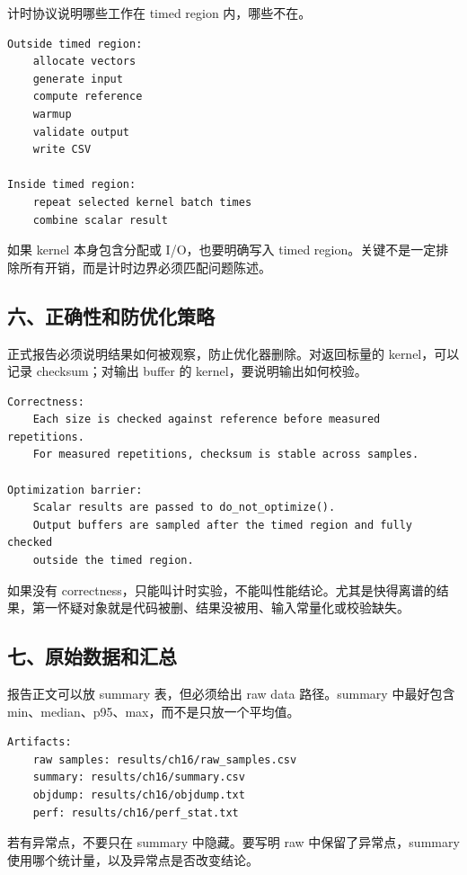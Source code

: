 计时协议说明哪些工作在 timed region 内，哪些不在。

\begin{lstlisting}
Outside timed region:
    allocate vectors
    generate input
    compute reference
    warmup
    validate output
    write CSV

Inside timed region:
    repeat selected kernel batch times
    combine scalar result
\end{lstlisting}

如果 kernel 本身包含分配或 I/O，也要明确写入 timed region。关键不是一定排除所有开销，而是计时边界必须匹配问题陈述。

\subsection{六、正确性和防优化策略}

正式报告必须说明结果如何被观察，防止优化器删除。对返回标量的 kernel，可以记录 checksum；对输出 buffer 的 kernel，要说明输出如何校验。

\begin{lstlisting}
Correctness:
    Each size is checked against reference before measured repetitions.
    For measured repetitions, checksum is stable across samples.

Optimization barrier:
    Scalar results are passed to do_not_optimize().
    Output buffers are sampled after the timed region and fully checked
    outside the timed region.
\end{lstlisting}

如果没有 correctness，只能叫计时实验，不能叫性能结论。尤其是快得离谱的结果，第一怀疑对象就是代码被删、结果没被用、输入常量化或校验缺失。

\subsection{七、原始数据和汇总}

报告正文可以放 summary 表，但必须给出 raw data 路径。summary 中最好包含 min、median、p95、max，而不是只放一个平均值。

\begin{lstlisting}
Artifacts:
    raw samples: results/ch16/raw_samples.csv
    summary: results/ch16/summary.csv
    objdump: results/ch16/objdump.txt
    perf: results/ch16/perf_stat.txt
\end{lstlisting}

若有异常点，不要只在 summary 中隐藏。要写明 raw 中保留了异常点，summary 使用哪个统计量，以及异常点是否改变结论。


